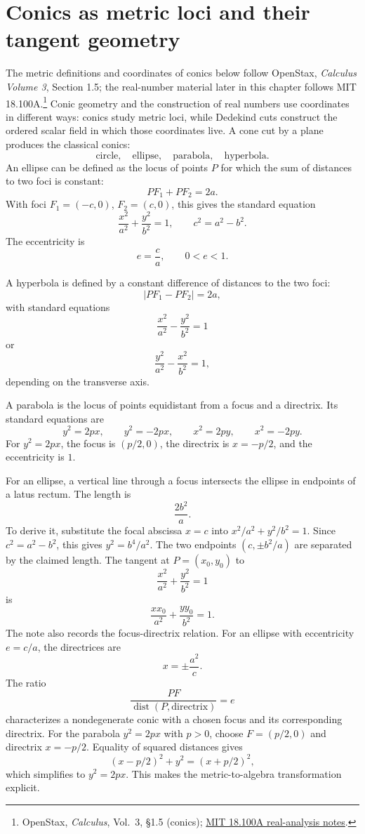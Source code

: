 
\section{Conics as metric loci and their tangent geometry}

The metric definitions and coordinates of conics below follow OpenStax, \emph{Calculus Volume 3}, Section 1.5; the real-number material later in this chapter follows MIT 18.100A.\footnote{OpenStax, \emph{Calculus}, Vol.~3, \S1.5 (conics); \href{https://ocw.mit.edu/courses/18-100a-real-analysis-fall-2020/pages/lecture-notes-and-readings/}{MIT 18.100A real-analysis notes}.} Conic geometry and the construction of real numbers use coordinates in different ways: conics study metric loci, while Dedekind cuts construct the ordered scalar field in which those coordinates live. A cone cut by a plane produces the classical conics:
\[
  \text{circle},\quad \text{ellipse},\quad \text{parabola},\quad \text{hyperbola}.
\]
An ellipse can be defined as the locus of points \(P\) for which the sum of distances to two foci is constant:
\[
  PF_1+PF_2=2a.
\]
With foci \(F_1=(-c,0)\), \(F_2=(c,0)\), this gives the standard equation
\[
  \frac{x^2}{a^2}+\frac{y^2}{b^2}=1,\qquad c^2=a^2-b^2.
\]
The eccentricity is
\[
  e=\frac ca,\qquad 0<e<1.
\]

A hyperbola is defined by a constant difference of distances to the two foci:
\[
  |PF_1-PF_2|=2a,
\]
with standard equations
\[
  \frac{x^2}{a^2}-\frac{y^2}{b^2}=1
\]
or
\[
  \frac{y^2}{a^2}-\frac{x^2}{b^2}=1,
\]
depending on the transverse axis.

A parabola is the locus of points equidistant from a focus and a directrix.  Its standard equations are
\[
  y^2=2px,\qquad y^2=-2px,\qquad x^2=2py,\qquad x^2=-2py.
\]
For \(y^2=2px\), the focus is \((p/2,0)\), the directrix is \(x=-p/2\), and the eccentricity is \(1\).

For an ellipse, a vertical line through a focus intersects the ellipse in endpoints of a latus rectum.  The length is
\[
  \frac{2b^2}{a}.
\]
To derive it, substitute the focal abscissa \(x=c\) into \(x^2/a^2+y^2/b^2=1\). Since \(c^2=a^2-b^2\), this gives \(y^2=b^4/a^2\). The two endpoints \((c,\pm b^2/a)\) are separated by the claimed length.
The tangent at \(P=(x_0,y_0)\) to
\[
  \frac{x^2}{a^2}+\frac{y^2}{b^2}=1
\]
is
\[
  \frac{xx_0}{a^2}+\frac{yy_0}{b^2}=1.
\]
The note also records the focus-directrix relation.  For an ellipse with eccentricity \(e=c/a\), the directrices are
\[
  x=\pm\frac{a^2}{c}.
\]
The ratio
\[
  \frac{PF}{\operatorname{dist}(P,\text{directrix})}=e
\]
characterizes a nondegenerate conic with a chosen focus and its corresponding directrix. For the parabola \(y^2=2px\) with \(p>0\), choose \(F=(p/2,0)\) and directrix \(x=-p/2\). Equality of squared distances gives
\[
 (x-p/2)^2+y^2=(x+p/2)^2,
\]
which simplifies to \(y^2=2px\). This makes the metric-to-algebra transformation explicit.


